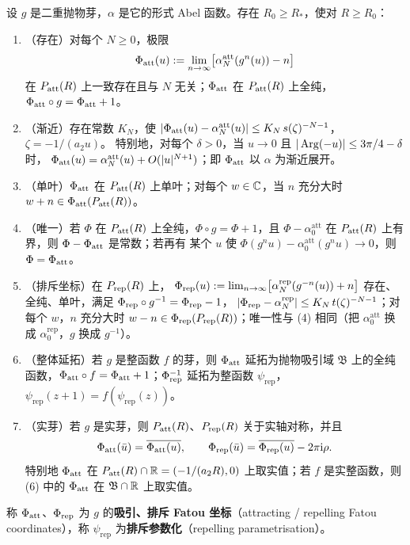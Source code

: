 \begin{theorem}[Fatou 坐标]\label{thm:fatou-coordinates}
设 $g$ 是二重抛物芽，$\alpha$ 是它的形式 Abel 函数。存在 $R_0\ge R_*$，使对 $R\ge R_0$：
\begin{enumerate}
\item （存在）对每个 $N\ge0$，极限
 \[
  \Phi_{\mathrm{att}}(u):=\lim_{n\to\infty}\bigl[\alpha_N^{\mathrm{att}}(g^n(u))-n\bigr]
 \]
 在 $P_{\mathrm{att}}(R)$ 上一致存在且与 $N$ 无关；$\Phi_{\mathrm{att}}$ 在 $P_{\mathrm{att}}(R)$ 上全纯，
 $\Phi_{\mathrm{att}}\circ g=\Phi_{\mathrm{att}}+1$。
\item （渐近）存在常数 $K_N$，使
 $|\Phi_{\mathrm{att}}(u)-\alpha_N^{\mathrm{att}}(u)|\le K_N\,s(\zeta)^{-N-1}$，$\zeta=-1/(a_2u)$。
 特别地，对每个 $\delta>0$，当 $u\to0$ 且 $|\operatorname{Arg}(-u)|\le3\pi/4-\delta$ 时，
 $\Phi_{\mathrm{att}}(u)=\alpha_N^{\mathrm{att}}(u)+O(|u|^{N+1})$；即 $\Phi_{\mathrm{att}}$ 以 $\alpha$ 为渐近展开。
\item （单叶）$\Phi_{\mathrm{att}}$ 在 $P_{\mathrm{att}}(R)$ 上单叶；对每个 $w\in\mathbb{C}$，当 $n$ 充分大时
 $w+n\in\Phi_{\mathrm{att}}(P_{\mathrm{att}}(R))$。
\item （唯一）若 $\Phi$ 在 $P_{\mathrm{att}}(R)$ 上全纯，$\Phi\circ g=\Phi+1$，且
 $\Phi-\alpha_0^{\mathrm{att}}$ 在 $P_{\mathrm{att}}(R)$ 上有界，则 $\Phi-\Phi_{\mathrm{att}}$ 是常数；若再有
 某个 $u$ 使 $\Phi(g^nu)-\alpha_0^{\mathrm{att}}(g^nu)\to0$，则 $\Phi=\Phi_{\mathrm{att}}$。
\item （排斥坐标）在 $P_{\mathrm{rep}}(R)$ 上，
 $\Phi_{\mathrm{rep}}(u):=\lim_{n\to\infty}\bigl[\alpha_N^{\mathrm{rep}}(g^{-n}(u))+n\bigr]$
 存在、全纯、单叶，满足 $\Phi_{\mathrm{rep}}\circ g^{-1}=\Phi_{\mathrm{rep}}-1$，
 $|\Phi_{\mathrm{rep}}-\alpha_N^{\mathrm{rep}}|\le K_N\,t(\zeta)^{-N-1}$；对每个 $w$，$n$ 充分大时
 $w-n\in\Phi_{\mathrm{rep}}(P_{\mathrm{rep}}(R))$；唯一性与 (4) 相同（把 $\alpha_0^{\mathrm{att}}$ 换成
 $\alpha_0^{\mathrm{rep}}$，$g$ 换成 $g^{-1}$）。
\item （整体延拓）若 $g$ 是整函数 $f$ 的芽，则 $\Phi_{\mathrm{att}}$ 延拓为抛物吸引域 $\mathfrak B$
 上的全纯函数，$\Phi_{\mathrm{att}}\circ f=\Phi_{\mathrm{att}}+1$；$\Phi_{\mathrm{rep}}^{-1}$ 延拓为整函数 $\psi_{\mathrm{rep}}$，
 $\psi_{\mathrm{rep}}(z+1)=f(\psi_{\mathrm{rep}}(z))$。
\item （实芽）若 $g$ 是实芽，则 $P_{\mathrm{att}}(R)$、$P_{\mathrm{rep}}(R)$ 关于实轴对称，并且
 \[
  \Phi_{\mathrm{att}}(\bar u)=\overline{\Phi_{\mathrm{att}}(u)},\qquad \Phi_{\mathrm{rep}}(\bar u)=\overline{\Phi_{\mathrm{rep}}(u)}-2\pi\mathrm{i}\rho .
 \]
 特别地 $\Phi_{\mathrm{att}}$ 在 $P_{\mathrm{att}}(R)\cap\mathbb{R}=(-1/(a_2R),0)$ 上取实值；若 $f$ 是实整函数，则 (6) 中的
 $\Phi_{\mathrm{att}}$ 在 $\mathfrak B\cap\mathbb{R}$ 上取实值。
\end{enumerate}
称 $\Phi_{\mathrm{att}}$、$\Phi_{\mathrm{rep}}$ 为 $g$ 的\textbf{吸引、排斥 Fatou 坐标}（attracting / repelling Fatou
coordinates），称 $\psi_{\mathrm{rep}}$ 为\textbf{排斥参数化}（repelling parametrisation）。
\end{theorem}

